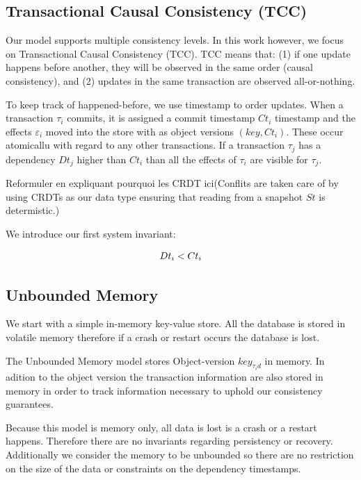 \documentclass[systeme]{compas2022}
\begin{document}
\subsection{Transactional Causal Consistency (TCC)}

Our model supports multiple consistency levels. In this work however, we focus on Transactional Causal Consistency (TCC).
TCC means that: (1) if one update happens before another, they will be observed in the same order (causal consistency), and (2) updates in the same transaction are observed all-or-nothing.

To keep track of happened-before, we use timestamp to order updates.
When a transaction $\tau_i$ commits, it is assigned a commit timestamp $Ct_i$ timestamp and the effects $\varepsilon_i$ moved into the store with as object versions $(key,Ct_i)$.
These occur atomicallu with regard to any other transactions.
If a transaction $\tau_j$ has a dependency $Dt_j$ higher than $Ct_i$ than all the effects of $\tau_i$ are visible for $\tau_j$.

Reformuler en expliquant pourquoi les CRDT ici(Conflits are taken care of by using CRDTs as our data type ensuring that reading from a snapshot $St$ is determistic.)

We introduce our first system invariant:

\[
  \begin{array}{lcl}
    \emph{$Dt_i < Ct_i$}
  \end{array} 
\]

\subsection{Unbounded Memory}

We start with a simple in-memory key-value store.
All the database is stored in volatile memory therefore if a crash or restart occurs the database is lost.

The Unbounded Memory model stores Object-version $key_{\tau_id}$ in memory.
In adition to the object version the transaction information are also stored in memory in order to track information necessary to uphold our consistency guarantees.

Because this model is memory only, all data is lost is a crash or a restart happens.
Therefore there are no invariants regarding persistency or recovery.
Additionally we consider the memory to be unbounded so there are no restriction on the size of the data or constraints on the dependency timestamps.
\end{document}
